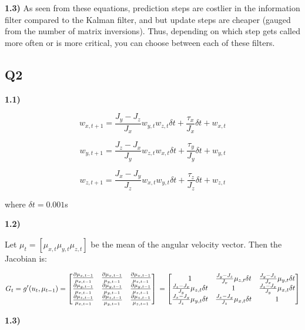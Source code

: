 \documentclass[11pt]{article}
\begin{document}
    \textbf{1.3)} As seen from these equations, prediction steps are
costlier in the information filter compared to the Kalman filter, and
but update steps are cheaper (gauged from the number of matrix
inversions). Thus, depending on which step gets called more often or is
more critical, you can choose between each of these filters.

    \subsection{Q2}\label{q2}

    \textbf{1.1)}

    \[
w_{x,t+1} = \frac{J_y - J_z}{J_x} w_{y,t} w_{z,t} \delta t + \frac{\tau_x}{J_x} \delta t + w_{x,t}
\]

\[
w_{y,t+1} = \frac{J_z - J_x}{J_y} w_{z,t} w_{x,t} \delta t + \frac{\tau_y}{J_y} \delta t + w_{y,t}
\]

\[
w_{z,t+1} = \frac{J_x - J_y}{J_z} w_{x,t} w_{y,t} \delta t + \frac{\tau_z}{J_z} \delta t + w_{z,t}
\]

where \(\delta t = 0.001\)s

    \textbf{1.2)}

Let \(\mu_{t} = [\mu_{x,t} \mu_{y,t} \mu_{z,t}]\) be the mean of the
angular velocity vector. Then the Jacobian is:

\[
G_t = g'(u_t, \mu_{t-1}) = \begin{bmatrix}
\frac{\partial \mu_{x,t-1}}{\mu_{x,t-1}} & \frac{\partial \mu_{x,t-1}}{\mu_{y,t-1}}  & \frac{\partial \mu_{x,t-1}}{\mu_{z,t-1}} \\
\frac{\partial \mu_{y,t-1}}{\mu_{x,t-1}} & \frac{\partial \mu_{y,t-1}}{\mu_{y,t-1}}  & \frac{\partial \mu_{y,t-1}}{\mu_{z,t-1}} \\
\frac{\partial \mu_{z,t-1}}{\mu_{x,t-1}} & \frac{\partial \mu_{z,t-1}}{\mu_{y,t-1}}  & \frac{\partial \mu_{z,t-1}}{\mu_{z,t-1}} 
\end{bmatrix} \\
= \begin{bmatrix}
1 & \frac{J_y - J_z}{J_x} \mu_{z,t} \delta t   & \frac{J_y - J_z}{J_x} \mu_{y,t} \delta t  \\
\frac{J_z - J_x}{J_y}\mu_{z,t} \delta t  & 1  & \frac{J_z - J_x}{J_y}\mu_{x,t} \delta t \\
\frac{J_x - J_y}{J_z}\mu_{y,t} \delta t & \frac{J_x - J_y}{J_z}\mu_{x,t} \delta t  & 1 
\end{bmatrix}
\]

    \textbf{1.3)}
\end{document}
